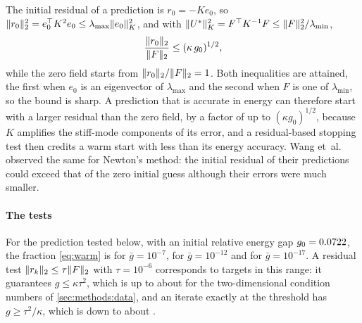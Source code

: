 \begin{remark}\label{rem:residual}
The initial residual of a prediction is $r_0=-Ke_0$, so
$\lVert r_0\rVert_2^2=e_0^{\top}K^2e_0\le\lambda_{\max}\lVert e_0\rVert_K^2$, and with
$\lVert U^{\ast}\rVert_K^2=F^{\top}K^{-1}F\le\lVert F\rVert_2^2/\lambda_{\min}$,
\begin{equation}
\frac{\lVert r_0\rVert_2}{\lVert F\rVert_2} \le (\kappa\,g_0)^{1/2},
\label{eq:residual}
\end{equation}
while the zero field starts from $\lVert r_0\rVert_2/\lVert F\rVert_2=1$. Both inequalities are
attained, the first when $e_0$ is an eigenvector of $\lambda_{\max}$ and the second when $F$
is one of $\lambda_{\min}$, so the bound is sharp. A prediction that is accurate in energy
can therefore start with a larger residual than the zero field, by a factor of up to
$(\kappa g_0)^{1/2}$, because $K$ amplifies the stiff-mode components of its error, and a
residual-based stopping test then credits a warm start with less than its energy accuracy.
Wang et~al.~\cite{Wang2026PretrainFEM} observed the same for Newton's method: the initial
residual of their predictions could exceed that of the zero initial guess although their
errors were much smaller.
\end{remark}

\paragraph{The tests}
For the prediction tested below, with an initial relative energy gap
$g_0=0.0722$, the fraction \eqref{eq:warm} is \numWarmFractionSeven{} for $\bar
g=10^{-7}$, \numWarmFractionTwelve{} for $\bar g=10^{-12}$ and \numWarmFractionSeventeen{}
for $\bar g=10^{-17}$. A residual test $\lVert r_k\rVert_2\le\tau\lVert F\rVert_2$ with $\tau=10^{-6}$
corresponds to targets in this range: it guarantees $g\le\kappa\tau^2$, which is up to about
\numKappaTauTwo{} for the two-dimensional condition numbers of \cref{sec:methods:data}, and
an iterate exactly at the threshold has $g\ge\tau^2/\kappa$, which is down to about
\numTauSqKappaTwo{}.


